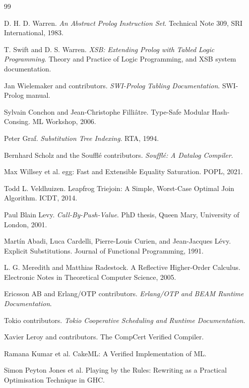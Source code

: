 \documentclass[11pt]{article}
\begin{document}
\begin{thebibliography}{99}

D. H. D. Warren.
\newblock \emph{An Abstract Prolog Instruction Set}.
\newblock Technical Note 309, SRI International, 1983.

T. Swift and D. S. Warren.
\newblock \emph{XSB: Extending Prolog with Tabled Logic Programming}.
\newblock Theory and Practice of Logic Programming, and XSB system documentation.

Jan Wielemaker and contributors.
\newblock \emph{SWI-Prolog Tabling Documentation}.
\newblock SWI-Prolog manual.

Sylvain Conchon and Jean-Christophe Filli\^{a}tre.
\newblock Type-Safe Modular Hash-Consing.
\newblock ML Workshop, 2006.

Peter Graf.
\newblock \emph{Substitution Tree Indexing}.
\newblock RTA, 1994.

Bernhard Scholz and the Souffl\'{e} contributors.
\newblock \emph{Souffl\'{e}: A Datalog Compiler}.

Max Willsey et al.
\newblock egg: Fast and Extensible Equality Saturation.
\newblock POPL, 2021.

Todd L. Veldhuizen.
\newblock Leapfrog Triejoin: A Simple, Worst-Case Optimal Join Algorithm.
\newblock ICDT, 2014.

Paul Blain Levy.
\newblock \emph{Call-By-Push-Value}.
\newblock PhD thesis, Queen Mary, University of London, 2001.

Mart\'{i}n Abadi, Luca Cardelli, Pierre-Louis Curien, and Jean-Jacques L\'{e}vy.
\newblock Explicit Substitutions.
\newblock Journal of Functional Programming, 1991.

L. G. Meredith and Matthias Radestock.
\newblock A Reflective Higher-Order Calculus.
\newblock Electronic Notes in Theoretical Computer Science, 2005.

Ericsson AB and Erlang/OTP contributors.
\newblock \emph{Erlang/OTP and BEAM Runtime Documentation}.

Tokio contributors.
\newblock \emph{Tokio Cooperative Scheduling and Runtime Documentation}.

Xavier Leroy and contributors.
\newblock The CompCert Verified Compiler.

Ramana Kumar et al.
\newblock CakeML: A Verified Implementation of ML.

Simon Peyton Jones et al.
\newblock Playing by the Rules: Rewriting as a Practical Optimisation Technique in GHC.

\end{thebibliography}
\end{document}
